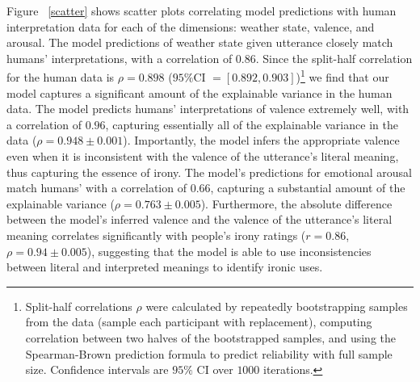 \documentclass[10pt,letterpaper]{article}
\begin{document}
Figure ~\ref{scatter} shows scatter plots correlating model predictions with human interpretation data for each of the dimensions: weather state, valence, and arousal. %
The model predictions of weather state given utterance closely match humans' interpretations, with a correlation of $0.86$. Since the split-half correlation for the human data is $\rho=0.898$ ($95\%$CI $= [0.892, 0.903]$)\footnote{Split-half correlations $\rho$ were calculated by repeatedly bootstrapping samples from the data (sample each participant with replacement), computing correlation between two halves of the bootstrapped samples, and using the Spearman-Brown prediction formula to predict reliability with full sample size. Confidence intervals are $95\%$ CI over $1000$ iterations.}  we find that our model captures a significant amount of the explainable variance in the human data. The model predicts humans' interpretations of valence extremely well, with a correlation of $0.96$, capturing essentially all of the explainable variance in the data ($\rho = 0.948\pm0.001$).
Importantly, the model infers the appropriate valence even when it is inconsistent with the valence of the utterance's literal meaning, thus capturing the essence of irony. 
The model's predictions for emotional arousal match humans' with a correlation of $0.66$, capturing a substantial amount of the explainable variance ($\rho = 0.763\pm0.005$). Furthermore, the absolute difference between the model's inferred valence and the valence of the utterance's literal meaning correlates significantly with people's irony ratings ($r = 0.86$, $\rho=0.94 \pm 0.005$), suggesting that the model is able to use inconsistencies between literal and interpreted meanings to identify ironic uses.
\end{document}
